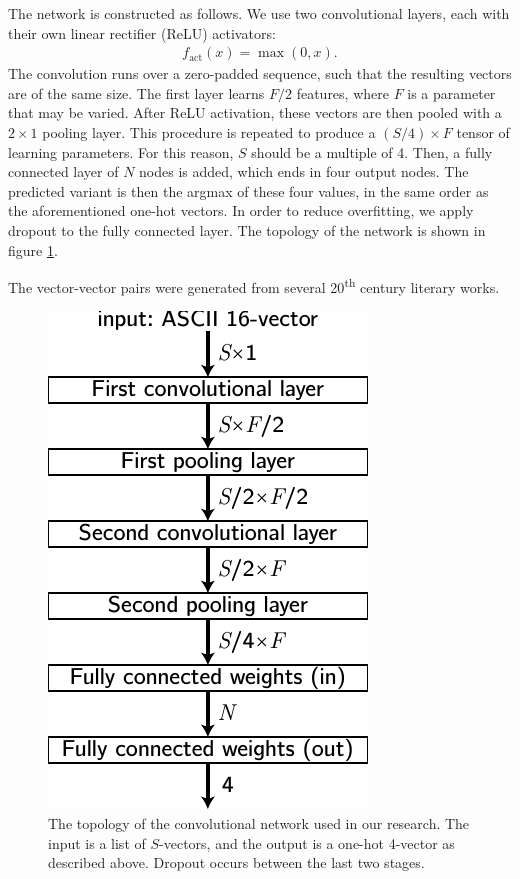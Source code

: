 \documentclass[11pt]{article}
\begin{document}
The network is constructed as follows. We use two convolutional layers, each with their own linear rectifier (ReLU) activators:
\begin{align}
f_\text{act}(x)=\max(0, x).
\end{align}
The convolution runs over a zero-padded sequence, such that the resulting vectors are of the same size. The first layer learns $F/2$ features, where $F$ is a parameter that may be varied. After ReLU activation, these vectors are then pooled with a $2\times1$ pooling layer. This procedure is repeated to produce a $(S/4)\times F$ tensor of learning parameters. For this reason, $S$ should be a multiple of 4. Then, a fully connected layer of $N$ nodes is added, which ends in four output nodes. The predicted variant is then the argmax of these four values, in the same order as the aforementioned one-hot vectors. In order to reduce overfitting, we apply dropout to the fully connected layer. The topology of the network is shown in figure \ref{fig:convnet_topo}.\par
The vector-vector pairs were generated from several 20\textsuperscript{th} century literary works\cite{1, 2, 3, 4, 5}.
\begin{figure}[t]
\centering
\includegraphics[scale=1]{convnet_topo.pdf}
\caption{The topology of the convolutional network used in our research. The input is a list of $S$-vectors, and the output is a one-hot 4-vector as described above. Dropout occurs between the last two stages.}
\label{fig:convnet_topo}
\end{figure}
\end{document}

